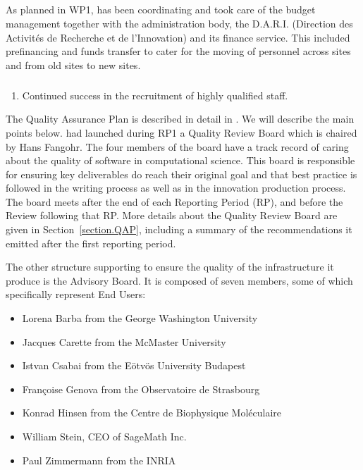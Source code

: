 \subparagraph{}

As planned in WP1,  has been coordinating \ODK and took care
of the budget management together with the administration body, the
D.A.R.I. (Direction des Activités de Recherche et de l'Innovation) and
its finance service. This included prefinancing and funds transfer to
cater for the moving of personnel across sites and from old sites to
new sites.


\subparagraph{}


\begin{enumerate}
\item Continued success in the recruitment of highly qualified staff.
\end{enumerate}

The Quality Assurance Plan is described in detail in
. We will describe the main points
below.  had launched during RP1 a Quality Review Board which
is chaired by Hans Fangohr. The four members of the board have a track
record of caring about the quality of software in computational
science. This board is responsible for ensuring key deliverables do
reach their original goal and that best practice is followed in the
writing process as well as in the innovation production process. The
board meets after the end of each Reporting Period (RP), and before
the Review following that RP. More details about the Quality Review
Board are given in Section~\ref{section.QAP}, including a summary of
the recommendations it emitted after the first reporting period.



The other structure supporting \ODK to ensure the quality of the
infrastructure it produce is the Advisory Board. It is composed of
seven members, some of which specifically represent End Users:

\begin{itemize}
\item{Lorena Barba from the George Washington University}
\item{Jacques Carette from the McMaster University}
\item{Istvan Csabai from the Eötvös University Budapest}
\item{Françoise Genova from the Observatoire de Strasbourg}
\item{Konrad Hinsen from the Centre de Biophysique Moléculaire}
\item{William Stein, CEO of SageMath Inc.}
\item{Paul Zimmermann from the INRIA}
\end{itemize}

